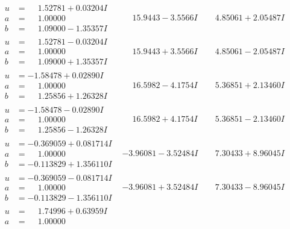 \documentclass[1p]{elsarticle_modified}
\theoremstyle{definition}
\begin{document}
$$\begin{array}{c|c|c}
\begin{aligned}
u &= \phantom{-}1.52781 + 0.03204 I \\
a &= \phantom{-}1.00000\phantom{ +0.000000I} \\
b &= \phantom{-}1.09000 - 1.35357 I\end{aligned}
 & \phantom{-}15.9443 - 3.5566 I & \phantom{-}4.85061 + 2.05487 I \\ \hline\begin{aligned}
u &= \phantom{-}1.52781 - 0.03204 I \\
a &= \phantom{-}1.00000\phantom{ +0.000000I} \\
b &= \phantom{-}1.09000 + 1.35357 I\end{aligned}
 & \phantom{-}15.9443 + 3.5566 I & \phantom{-}4.85061 - 2.05487 I \\ \hline\begin{aligned}
u &= -1.58478 + 0.02890 I \\
a &= \phantom{-}1.00000\phantom{ +0.000000I} \\
b &= \phantom{-}1.25856 + 1.26328 I\end{aligned}
 & \phantom{-}16.5982 - 4.1754 I & \phantom{-}5.36851 + 2.13460 I \\ \hline\begin{aligned}
u &= -1.58478 - 0.02890 I \\
a &= \phantom{-}1.00000\phantom{ +0.000000I} \\
b &= \phantom{-}1.25856 - 1.26328 I\end{aligned}
 & \phantom{-}16.5982 + 4.1754 I & \phantom{-}5.36851 - 2.13460 I \\ \hline\begin{aligned}
u &= -0.369059 + 0.081714 I \\
a &= \phantom{-}1.00000\phantom{ +0.000000I} \\
b &= -0.113829 + 1.356110 I\end{aligned}
 & -3.96081 - 3.52484 I & \phantom{-}7.30433 + 8.96045 I \\ \hline\begin{aligned}
u &= -0.369059 - 0.081714 I \\
a &= \phantom{-}1.00000\phantom{ +0.000000I} \\
b &= -0.113829 - 1.356110 I\end{aligned}
 & -3.96081 + 3.52484 I & \phantom{-}7.30433 - 8.96045 I \\ \hline\begin{aligned}
u &= \phantom{-}1.74996 + 0.63959 I \\
a &= \phantom{-}1.00000\phantom{ +0.000000I} \\

\end{aligned}
\end{array}$$
\end{document}
